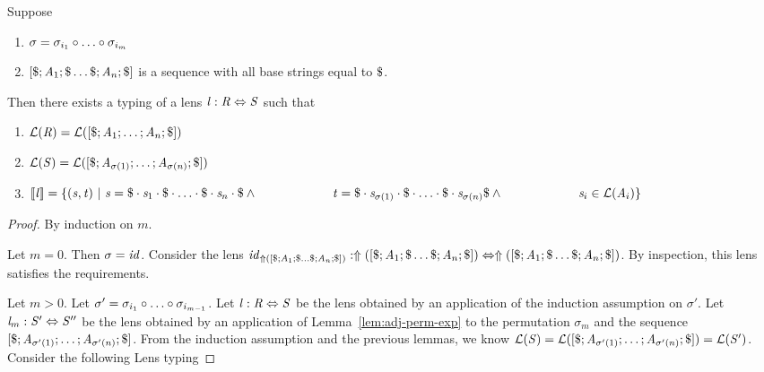 \documentclass[numbers]{sigplanconf}
\begin{document}
\begin{lemma}
\label{lem:adj-comp-perm-exp}
Suppose
\begin{enumerate}
\item $\sigma=\sigma_{i_1}\circ\ldots\circ\sigma_{i_m}$ 
\item $[\$;\mathit{A}_1;\$\ldots\$;\mathit{A}_n;\$]$ is a sequence with
all base strings equal to $\Sep$.
\end{enumerate}
Then there exists a typing of a lens $\mathit{l} : \mathit{R} \Leftrightarrow \mathit{S}$ such that
\begin{enumerate}
\item $\mathcal{L}(\mathit{R})=\mathcal{L}([\$;\mathit{A}_1;\ldots;\mathit{A}_n;\$])$
\item $\mathcal{L}(\mathit{S})=\mathcal{L}([\$;\mathit{A}_{\sigma(1)};\ldots;\mathit{A}_{\sigma(n)};\$])$
\item $[ \! [\mathit{l}] \! ]=
\{(\mathit{s},\mathit{t})~|~\mathit{s}=\$\cdot\mathit{s}_1\cdot\$\cdot\ldots\cdot\$\cdot\mathit{s}_n\cdot\$
\wedge\\
\hspace*{6em}\mathit{t}=\$\cdot\mathit{s}_{\sigma(1)}\cdot\$\cdot\ldots\cdot\$\cdot\mathit{s}_{\sigma(n)}\$\wedge\\
\hspace*{6em}\mathit{s}_i\in\mathcal{L}(\mathit{A}_i)\}$
\end{enumerate}
\begin{proof}
By induction on $m$.

Let $m=0$.  Then $\sigma=\mathit{id}$.  Consider the lens
$\mathit{id}_{\Uparrow([\$;\mathit{A}_1;\$\ldots\$;\mathit{A}_n;\$])} :
\Uparrow([\$;\mathit{A}_1;\$\ldots\$;\mathit{A}_n;\$]) \Leftrightarrow
\Uparrow([\$;\mathit{A}_1;\$\ldots\$;\mathit{A}_n;\$])$.
By inspection, this lens satisfies the requirements.

Let $m>0$.  Let $\sigma'=\sigma_{i_1}\circ\ldots\circ\sigma_{i_{m-1}}$.
Let $\mathit{l} : \mathit{R} \Leftrightarrow \mathit{S}$ be the lens obtained by an
application of the induction assumption on $\sigma'$.
Let $\mathit{l}_m : \mathit{S}' \Leftrightarrow \mathit{S}''$ be the lens obtained by
an application of Lemma~\ref{lem:adj-perm-exp} to the permutation $\sigma_m$ and
the sequence $[\$;\mathit{A}_{\sigma'(1)};\ldots;\mathit{A}_{\sigma'(n)};\$]$.
From the induction assumption and the previous lemmas,
we know $\mathcal{L}(\mathit{S})=
\mathcal{L}([\$;\mathit{A}_{\sigma'(1)};\ldots;\mathit{A}_{\sigma'(n)};\$])=
\mathcal{L}(\mathit{S}')$.
Consider the following Lens typing


\end{proof}
\end{lemma}
\end{document}
